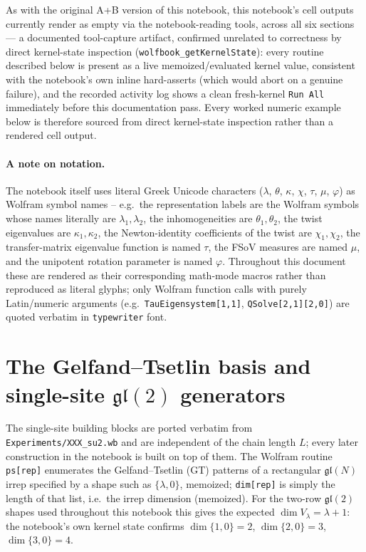 \documentclass[11pt]{article}
\begin{document}
As with the original A+B version of this notebook, this notebook's cell outputs currently render as
empty via the notebook-reading tools, across all six sections --- a documented tool-capture
artifact, confirmed unrelated to correctness by direct kernel-state inspection
(\texttt{wolfbook\_getKernelState}): every routine described below is present as a live
memoized/evaluated kernel value, consistent with the notebook's own inline hard-asserts (which
would abort on a genuine failure), and the recorded activity log shows a clean fresh-kernel
\texttt{Run All} immediately before this documentation pass. Every worked numeric example below is
therefore sourced from direct kernel-state inspection rather than a rendered cell output.

\paragraph{A note on notation.} The notebook itself uses literal Greek Unicode characters
($\lambda$, $\theta$, $\kappa$, $\chi$, $\tau$, $\mu$, $\varphi$) as Wolfram symbol names -- e.g.\
the representation labels are the Wolfram symbols whose names literally are $\lambda_1,\lambda_2$,
the inhomogeneities are $\theta_1,\theta_2$, the twist eigenvalues are $\kappa_1,\kappa_2$, the
Newton-identity coefficients of the twist are $\chi_1,\chi_2$, the transfer-matrix eigenvalue
function is named $\tau$, the FSoV measures are named $\mu$, and the unipotent rotation parameter is
named $\varphi$. Throughout this document these are rendered as their corresponding math-mode
macros rather than reproduced as literal glyphs; only Wolfram function calls with purely
Latin/numeric arguments (e.g.\ \texttt{TauEigensystem[1,1]}, \texttt{QSolve[2,1][2,0]}) are quoted
verbatim in \texttt{typewriter} font.

\section{The Gelfand--Tsetlin basis and single-site \texorpdfstring{$\mathfrak{gl}(2)$}{gl(2)} generators}
\label{sec:gt}

The single-site building blocks are ported verbatim from \texttt{Experiments/XXX\_su2.wb} and are
independent of the chain length $L$; every later construction in the notebook is built on top of
them. The Wolfram routine \texttt{ps[rep]} enumerates the Gelfand--Tsetlin (GT) patterns of a
rectangular $\mathfrak{gl}(N)$ irrep specified by a shape such as $\{\lambda,0\}$, memoized;
\texttt{dim[rep]} is simply the length of that list, i.e.\ the irrep dimension (memoized). For the
two-row $\mathfrak{gl}(2)$ shapes used throughout this notebook this gives the expected
$\dim V_\lambda = \lambda+1$: the notebook's own kernel state confirms $\dim\{1,0\}=2$,
$\dim\{2,0\}=3$, $\dim\{3,0\}=4$.
\end{document}
